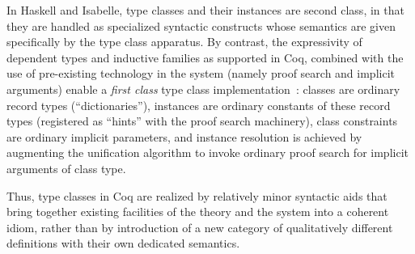 \documentclass[a4paper,10pt,runningheads]{llncs}
\begin{document}
In Haskell and Isabelle, type classes and their instances are second class, in that they are handled as specialized syntactic constructs whose semantics are given specifically by the type class apparatus. By contrast, the expressivity of dependent types and inductive families as supported in Coq, combined with the use of pre-existing technology in the system (namely proof search and implicit arguments) enable a \emph{first class} type class implementation~\cite{DBLP:conf/tphol/SozeauO08}: classes are ordinary record types (``dictionaries''), instances are ordinary constants of these record types (registered as ``hints'' with the proof search machinery), class constraints are ordinary implicit parameters, and instance resolution is achieved by augmenting the unification algorithm to invoke ordinary proof search for implicit arguments of class type.

Thus, type classes in Coq are realized by relatively minor syntactic aids that bring together existing facilities of the theory and the system into a coherent idiom, rather than by introduction of a new category of qualitatively different definitions with their own dedicated semantics.





% 
\end{document}
